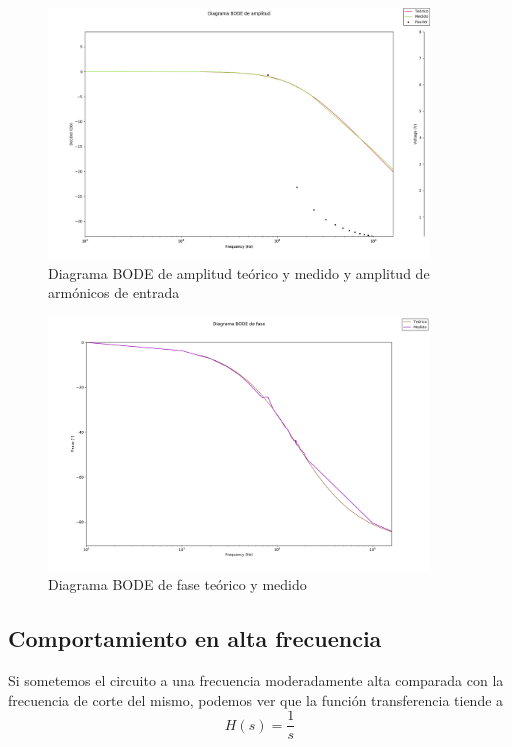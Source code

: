 \begin{figure}[H]
    \centering
    \includegraphics[width=0.9\textwidth]{./EJ2/EJ2_BODE_teorico.png}
    \caption{Diagrama BODE de amplitud te\'orico y medido y amplitud de arm\'onicos de entrada}
    \label{fig:bode_amp_superp_2} 
\end{figure}

\begin{figure}[H]
    \centering
    \includegraphics[width=0.9\textwidth]{./EJ2/EJ2_fase_BODE.png}
    \caption{Diagrama BODE de fase te\'orico y medido}
    \label{fig:bode_phase_superp_2} 
\end{figure}

\subsection{Comportamiento en alta frecuencia}

\quad \quad Si sometemos el circuito a una frecuencia moderadamente alta comparada con la frecuencia de corte del mismo, podemos ver que la funci\'on transferencia tiende a 
\begin{equation}\label{integrador_2}
    H(s)=\frac{1}{s}
\end{equation}

